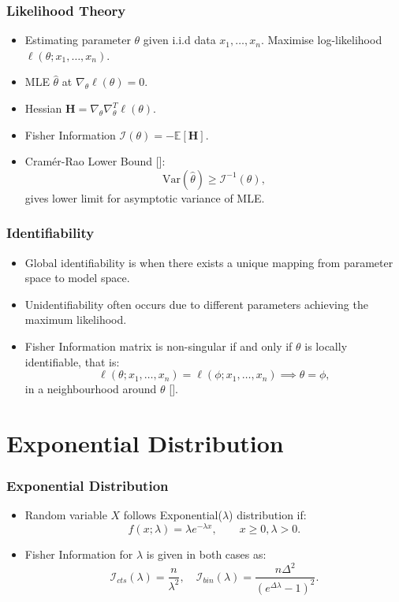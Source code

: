 \documentclass[11pt]{beamer}
\begin{document}
\begin{frame}
	\frametitle{Likelihood Theory}
	\begin{itemize}
		\item Estimating parameter $\theta$ given i.i.d data $x_1,\dots,x_n$. Maximise log-likelihood $\ell(\theta; x_1,\dots,x_n)$.
		\item MLE $\hat{\theta}$ at $\nabla_{\theta}\ell(\theta)=0$.
		\item Hessian $\mathbf{H} = \nabla_{\theta}\nabla_{\theta}^T \ell(\theta)$.
		\item Fisher Information $\mathcal{I}(\theta) = - \mathbb{E}\left[\mathbf{H}\right]$.
		\item Cram\'er-Rao Lower Bound [\cite{rao_crlb}]:
		\begin{equation*}
			\text{Var}(\hat{\theta}) \geq \mathcal{I}^{-1}(\theta),
		\end{equation*}
		gives lower limit for asymptotic variance of MLE.
	\end{itemize}
\end{frame}


\begin{frame}
	\frametitle{Identifiability}
	\begin{itemize}
		\item Global identifiability is when there exists a unique mapping from parameter space to model space.
		\item Unidentifiability often occurs due to different parameters achieving the maximum likelihood.
		\item Fisher Information matrix is non-singular if and only if $\theta$ is locally identifiable, that is:
		\begin{equation*}
			\ell(\theta; x_1, \dots, x_n) = \ell(\phi; x_1, \dots, x_n) \implies \theta = \phi,
		\end{equation*}
		in a neighbourhood around $\theta$ [\cite{rothenburg_1971}].
	\end{itemize}
\end{frame}

\section{Exponential Distribution}

\begin{frame}
	\frametitle{Exponential Distribution}
	\begin{itemize}
		\item Random variable $X$ follows Exponential($\lambda$) distribution if:
		\begin{equation*}
			f(x; \lambda) = \lambda e^{- \lambda x}, \quad \quad x \geq 0, \lambda > 0.
		\end{equation*}
		\item Fisher Information for $\lambda$ is given in both cases as:
		\begin{equation*}
			\mathcal{I}_{cts}(\lambda) = \frac{n}{\lambda^2}, \quad \mathcal{I}_{bin}(\lambda) = \frac{n \Delta^2}{(e^{\Delta \lambda} - 1)^2}.
	\end{equation*}
	\end{itemize}
\end{frame}
\end{document}
